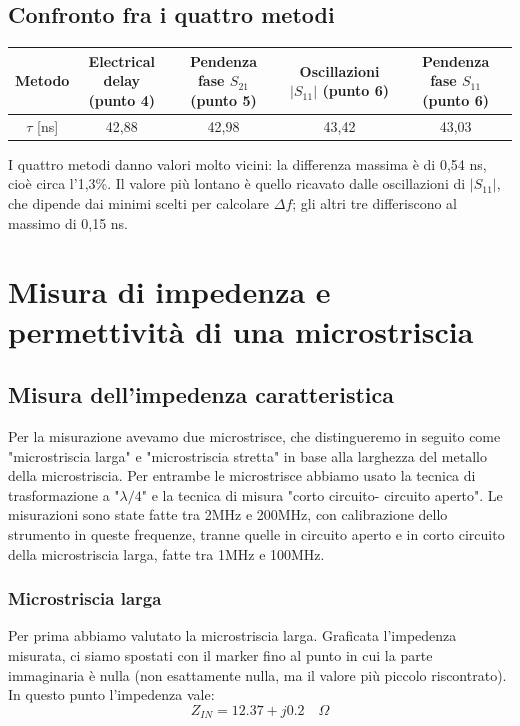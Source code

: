 \documentclass[11pt,a4paper,oneside]{book}
\begin{document}
\section{Confronto fra i quattro metodi}
\begin{center}
\begin{tabular}{|c|c|c|c|c|}
\hline
Metodo & \shortstack{Electrical delay\\(punto 4)} & \shortstack{Pendenza fase $S_{21}$\\(punto 5)} & \shortstack{Oscillazioni $|S_{11}|$\\(punto 6)} & \shortstack{Pendenza fase $S_{11}$\\(punto 6)} \\ \hline
$\tau$ [ns] & 42,88 & 42,98 & 43,42 & 43,03 \\ \hline
\end{tabular}
\end{center}
I quattro metodi danno valori molto vicini: la differenza massima è di 0,54 ns, cioè circa l'1,3\%. Il valore più lontano è quello ricavato dalle oscillazioni di $|S_{11}|$, che dipende dai minimi scelti per calcolare $\Delta f$; gli altri tre differiscono al massimo di 0,15 ns.

\chapter{Misura di impedenza e permettività di una microstriscia}
\section{Misura dell'impedenza caratteristica}
Per la misurazione avevamo due microstrisce, che distingueremo in seguito come "microstriscia larga" e "microstriscia stretta" in base 
alla larghezza del metallo della microstriscia. Per
entrambe le microstrisce abbiamo usato la tecnica di trasformazione a "$\lambda/4$" e la tecnica di misura "corto circuito-
circuito aperto". Le misurazioni sono state fatte tra 2MHz e 200MHz, con calibrazione dello strumento in queste frequenze, tranne quelle in circuito aperto e in corto circuito della microstriscia larga, fatte tra 1MHz e 100MHz.

\subsection{Microstriscia larga}
Per prima abbiamo valutato la microstriscia larga. Graficata l'impedenza misurata, ci siamo spostati con il marker fino al punto 
in cui la parte immaginaria è nulla (non esattamente nulla, ma il valore più piccolo riscontrato). In questo punto l'impedenza vale:
\begin{equation}
Z_{IN}=12.37 +j0.2 \quad \Omega
\end{equation}
\end{document}
